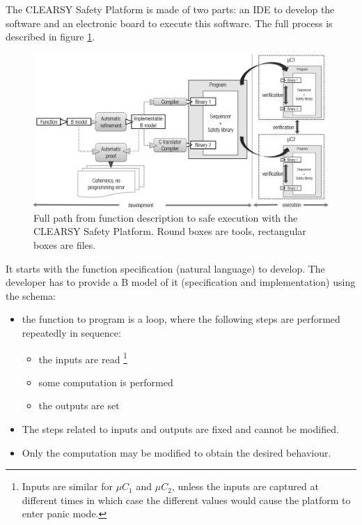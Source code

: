 The CLEARSY Safety Platform  is made of two parts: an IDE to develop the software and an electronic board to execute this software. The full process is described in figure \ref{arch:principes}.

\begin{figure}[h]
\centering\includegraphics[scale=0.24]{Pictures/chapterSafetyPrinciples/ARCH-LCHIP-principe.jpg}
\caption{Full path from function description to safe execution with the CLEARSY Safety Platform. Round boxes are tools, rectangular boxes are files.}
\label{arch:principes}
\end{figure}

It starts with the function specification (natural language) to develop. The developer has to provide a B model of it (specification and implementation) using the schema:
\begin{itemize}
    \item the function to program is a loop, where the following steps are performed repeatedly in sequence:
\begin{itemize}
    \item the inputs are read \footnote{Inputs are similar for $\mu C_1$ and $\mu C_2$, unless the inputs are captured at different times in which case the different values would cause the platform to enter panic mode.}
    \item some computation is performed
    \item the outputs are set
\end{itemize}
\item The steps related to inputs and outputs are fixed and cannot be modified. 
\item Only the computation may be modified to obtain the desired behaviour.\\
\end{itemize}


